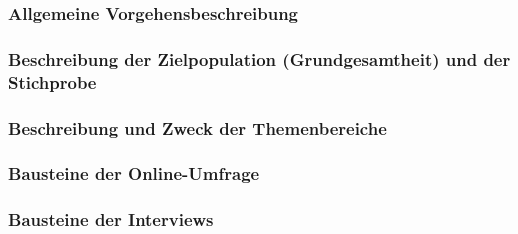 \documentclass[../../main.tex]{subfiles}
\begin{document}
\subsubsection{Allgemeine Vorgehensbeschreibung}\mbox{}





\subsubsection{Beschreibung der Zielpopulation (Grundgesamtheit) und der Stichprobe}\mbox{}





\subsubsection{Beschreibung und Zweck der Themenbereiche}\mbox{}





\subsubsection{Bausteine der Online-Umfrage}\mbox{}





\subsubsection{Bausteine der Interviews}\mbox{}


\end{document}
